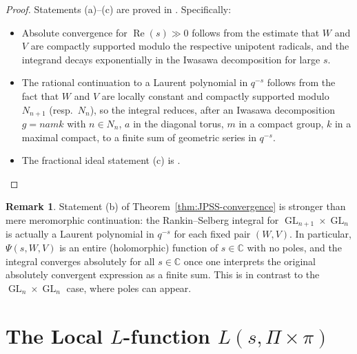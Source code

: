 \documentclass[12pt]{article}
\theoremstyle{definition}
\newtheorem{remark}[theorem]{Remark}
\DeclareMathOperator{\GL}{GL}
\DeclareMathOperator{\Re}{Re}
\begin{document}
\begin{proof}
Statements (a)--(c) are proved in \cite[Section~2]{JPSS83}.  Specifically:
\begin{itemize}
\item Absolute convergence for $\Re(s) \gg 0$ follows from the estimate
  that $W$ and $V$ are compactly supported modulo the respective unipotent
  radicals, and the integrand decays exponentially in the Iwasawa decomposition
  for large $s$.
\item The rational continuation to a Laurent polynomial in $q^{-s}$ follows
  from the fact that $W$ and $V$ are locally constant and compactly supported
  modulo $N_{n+1}$ (resp.\ $N_n$), so the integral reduces, after an Iwasawa
  decomposition $g = namk$ with $n \in N_n$, $a$ in the diagonal torus, $m$
  in a compact group, $k$ in a maximal compact, to a finite sum of geometric
  series in $q^{-s}$.
\item The fractional ideal statement (c) is \cite[Theorem~2.7]{JPSS83}.
\end{itemize}
\end{proof}

\begin{remark}
\label{rem:finiteness}
Statement (b) of Theorem~\ref{thm:JPSS-convergence} is stronger than mere
meromorphic continuation: the Rankin--Selberg integral for $\GL_{n+1} \times
\GL_n$ is actually a Laurent polynomial in $q^{-s}$ for each fixed pair $(W,V)$.
In particular, $\Psi(s,W,V)$ is an entire (holomorphic) function of $s \in
\mathbb{C}$ with no poles, and the integral converges absolutely for all $s \in
\mathbb{C}$ once one interprets the original absolutely convergent expression
as a finite sum.  This is in contrast to the $\GL_n \times \GL_n$ case, where
poles can appear.
\end{remark}

\section{The Local $L$-function $L(s,\Pi\times\pi)$}
\label{sec:Lfactor}
\end{document}
